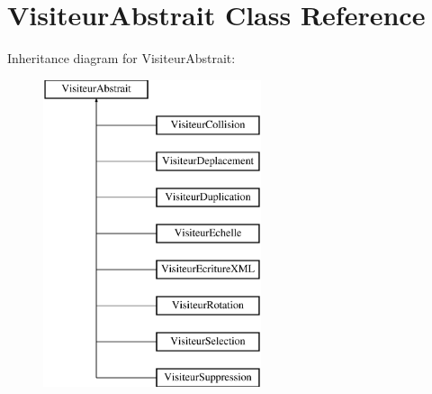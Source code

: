 \hypertarget{class_visiteur_abstrait}{}\section{Visiteur\+Abstrait Class Reference}
\label{class_visiteur_abstrait}
Inheritance diagram for Visiteur\+Abstrait\+:\begin{figure}[H]
\begin{center}
\leavevmode
\includegraphics[height=9.000000cm]{class_visiteur_abstrait}
\end{center}
\end{figure}
